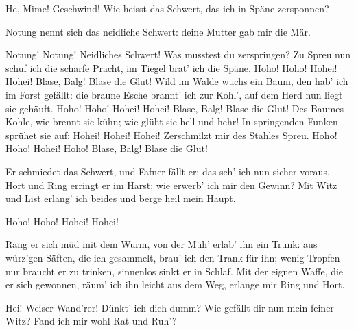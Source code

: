 \begin{drama}

He, Mime! Geschwind!
Wie heisst das Schwert,
das ich in Späne zersponnen?

\Mimespeaks


Notung nennt sich
das neidliche Schwert:
deine Mutter gab mir die Mär.

\Siegfriedspeaks


Notung! Notung!
Neidliches Schwert!
Was musstest du zerspringen?
Zu Spreu nun schuf ich
die scharfe Pracht,
im Tiegel brat' ich die Späne.
Hoho! Hoho!
Hohei! Hohei!
Blase, Balg!
Blase die Glut!
Wild im Walde
wuchs ein Baum,
den hab' ich im Forst gefällt:
die braune Esche
brannt' ich zur Kohl',
auf dem Herd nun liegt sie gehäuft.
Hoho! Hoho!
Hohei! Hohei!
Blase, Balg!
Blase die Glut!
Des Baumes Kohle,
wie brennt sie kühn;
wie glüht sie hell und hehr!
In springenden Funken
sprühet sie auf:
Hohei! Hohei! Hohei!
Zerschmilzt mir des Stahles Spreu.
Hoho! Hoho!
Hohei! Hoho!
Blase, Balg!
Blase die Glut!

\Mimespeaks


Er schmiedet das Schwert,
und Fafner fällt er:
das seh' ich nun sicher voraus.
Hort und Ring
erringt er im Harst:
wie erwerb' ich mir den Gewinn?
Mit Witz und List
erlang' ich beides
und berge heil mein Haupt.

\Siegfriedspeaks


Hoho! Hoho!
Hohei! Hohei!

\Mimespeaks


Rang er sich müd mit dem Wurm,
von der Müh' erlab' ihn ein Trunk:
aus würz'gen Säften,
die ich gesammelt,
brau' ich den Trank für ihn;
wenig Tropfen nur
braucht er zu trinken,
sinnenlos sinkt er in Schlaf.
Mit der eignen Waffe,
die er sich gewonnen,
räum' ich ihn leicht aus dem Weg,
erlange mir Ring und Hort.


Hei! Weiser Wand'rer!
Dünkt' ich dich dumm?
Wie gefällt dir nun
mein feiner Witz?
Fand ich mir wohl
Rat und Ruh'?


\end{drama}
